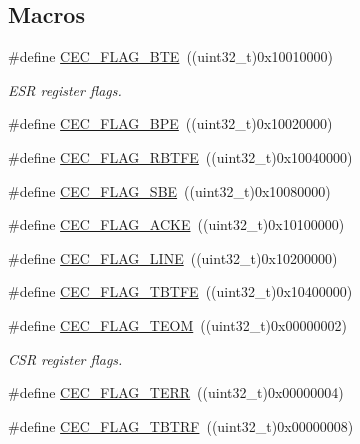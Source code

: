 \subsection*{Macros}
\begin{DoxyCompactItemize}
\item 
\#define \hyperlink{group___c_e_c__flags__definition_ga66e91438a7df5d00db3c5410d8f7d456}{C\+E\+C\+\_\+\+F\+L\+A\+G\+\_\+\+B\+TE}~((uint32\+\_\+t)0x10010000)
\begin{DoxyCompactList}\small\item\em E\+SR register flags. \end{DoxyCompactList}\item 
\#define \hyperlink{group___c_e_c__flags__definition_gaf2a5d5dcbc57fc0cf7cfa988533a2a09}{C\+E\+C\+\_\+\+F\+L\+A\+G\+\_\+\+B\+PE}~((uint32\+\_\+t)0x10020000)
\item 
\#define \hyperlink{group___c_e_c__flags__definition_gafdfca815014dee4a458083337795c336}{C\+E\+C\+\_\+\+F\+L\+A\+G\+\_\+\+R\+B\+T\+FE}~((uint32\+\_\+t)0x10040000)
\item 
\#define \hyperlink{group___c_e_c__flags__definition_gac77db62c05af2462ed3f1b64cef2e136}{C\+E\+C\+\_\+\+F\+L\+A\+G\+\_\+\+S\+BE}~((uint32\+\_\+t)0x10080000)
\item 
\#define \hyperlink{group___c_e_c__flags__definition_ga1583b7a221e54f2f19cb121bf310547c}{C\+E\+C\+\_\+\+F\+L\+A\+G\+\_\+\+A\+C\+KE}~((uint32\+\_\+t)0x10100000)
\item 
\#define \hyperlink{group___c_e_c__flags__definition_gaf751970725df12976dc6c8356910143a}{C\+E\+C\+\_\+\+F\+L\+A\+G\+\_\+\+L\+I\+NE}~((uint32\+\_\+t)0x10200000)
\item 
\#define \hyperlink{group___c_e_c__flags__definition_gaae90fd2f95085e113b6943bb35d899ba}{C\+E\+C\+\_\+\+F\+L\+A\+G\+\_\+\+T\+B\+T\+FE}~((uint32\+\_\+t)0x10400000)
\item 
\#define \hyperlink{group___c_e_c__flags__definition_gad0adfb11294f562f2c8dc555f69e25e0}{C\+E\+C\+\_\+\+F\+L\+A\+G\+\_\+\+T\+E\+OM}~((uint32\+\_\+t)0x00000002)
\begin{DoxyCompactList}\small\item\em C\+SR register flags. \end{DoxyCompactList}\item 
\#define \hyperlink{group___c_e_c__flags__definition_ga7edc608ca7b4ea74dd4d795fa3214c11}{C\+E\+C\+\_\+\+F\+L\+A\+G\+\_\+\+T\+E\+RR}~((uint32\+\_\+t)0x00000004)
\item 
\#define \hyperlink{group___c_e_c__flags__definition_gaeb02634fdd06f4ea0990e2cf23cf200e}{C\+E\+C\+\_\+\+F\+L\+A\+G\+\_\+\+T\+B\+T\+RF}~((uint32\+\_\+t)0x00000008)

\end{DoxyCompactItemize}
